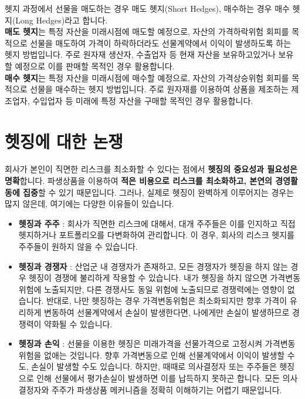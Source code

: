 \documentclass[
  letterpaper,
  DIV=11,
  numbers=noendperiod]{scrreprt}
\begin{document}
\begin{tcolorbox}[enhanced jigsaw, opacitybacktitle=0.6, leftrule=.75mm, colback=white, toptitle=1mm, breakable, colframe=quarto-callout-tip-color-frame, bottomtitle=1mm, coltitle=black, titlerule=0mm, arc=.35mm, toprule=.15mm, rightrule=.15mm, bottomrule=.15mm, title=\textcolor{quarto-callout-tip-color}{\faLightbulb}\hspace{0.5em}{매도 헷지 vs.~매수 헷지}, colbacktitle=quarto-callout-tip-color!10!white, left=2mm, opacityback=0]

헷지 과정에서 선물을 매도하는 경우 매도 헷지(Short Hedges), 매수하는
경우 매수 헷지(Long Hedges)라고 합니다.\\
\textbf{매도 헷지}는 특정 자산을 미래시점에 매도할 예정으로, 자산의
가격하락위험 회피를 목적으로 선물을 매도하여 가격이 하락하더라도
선물계약에서 이익이 발생하도록 하는 헷지 방법입니다. 주로 원자재 생산자,
수출업자 등 현재 자산을 보유하고있거나 보유할 예정으로 이를 판매할
목적인 경우 활용합니다.\\
\textbf{매수 헷지}는 특정 자산을 미래시점에 매수할 예정으로, 자산의
가격상승위험 회피를 목적으로 선물을 매수하는 헷지 방법입니다. 주로
원자재를 이용하여 상품을 제조하는 제조업자, 수입업자 등 미래에 특정
자산을 구매할 목적인 경우 활용합니다.

\end{tcolorbox}

\section{헷징에 대한
논쟁}\label{uxd5f7uxc9d5uxc5d0-uxb300uxd55c-uxb17cuxc7c1}

회사가 본인이 직면한 리스크를 최소화할 수 있다는 점에서 \textbf{헷징의
중요성과 필요성은 명확}합니다. 파생상품을 이용하여 \textbf{적은 비용으로
리스크를 최소화하고, 본연의 경영활동에 집중}할 수 있기 때문입니다.
그러나, 실제로 헷징이 완벽하게 이루어지는 경우는 많지 않은데, 여기에는
다양한 이유들이 있습니다.

\begin{itemize}
\item
  \textbf{헷징과 주주} : 회사가 직면한 리스크에 대해서, 대개 주주들은
  이를 인지하고 직접 헷지하거나 포트폴리오를 다변화하여 관리합니다. 이
  경우, 회사의 리스크 헷지를 주주들이 원하지 않을 수 있습니다.
\item
  \textbf{헷징과 경쟁자} : 산업군 내 경쟁자가 존재하고, 모든 경쟁자가
  헷징을 하지 않는 경우 헷징이 경쟁에 불리하게 작용할 수 있습니다. 내가
  헷징을 하지 않으면 가격변동위험에 노출되지만, 다른 경쟁사도 동일
  위험에 노출되므로 경쟁력에는 영향이 없습니다. 반대로, 나만 헷징하는
  경우 가격변동위험은 최소화되지만 향후 가격이 유리하게 변동하여
  선물계약에서 손실이 발생한다면, 나에게만 손실이 발생하므로 경쟁력이
  약화될 수 있습니다.
\item
  \textbf{헷징과 손익} : 선물을 이용한 헷징은 미래가격을 선물가격으로
  고정시켜 가격변동위험을 없애는 것입니다. 향후 가격변동으로 인해
  선물계약에서 이익이 발생할 수도, 손실이 발생할 수도 있습니다. 하지만,
  때때로 의사결정자 또는 주주들은 헷징으로 인해 선물에서 평가손실이
  발생하면 이를 납득하지 못하곤 합니다. 모든 의사결정자와 주주가
  파생상품 메커니즘을 정확히 이해하기는 어렵기 때문입니다.
\end{itemize}
\end{document}
